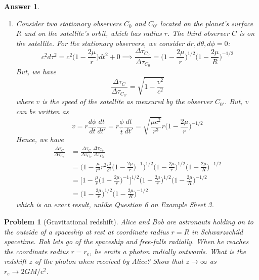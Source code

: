 \documentclass[a4paper]{article}
\theoremstyle{new2}
\newtheorem{ans}{Answer}[section]
\theoremstyle{new}
\newtheorem{qns}{Problem}[section]
\begin{document}
\begin{ans}
\begin{enumerate}[label=(\alph*)]
$$,\quad\Gamma^\theta_{r\theta}=\frac{2}{r}\frac{1}{2}=\frac{1}{r}$$
$$\Gamma^\phi_{\theta\phi}=2\cot\theta\frac{1}{2},\quad\Gamma^\phi_{r\phi}=\frac{2}{r}\frac{1}{2}$$
where we take a factor 1/2 if the connection $\Gamma$ has unequal lower indices since $\dot{x}^\nu\dot{x}^\sigma$ term is summed twice and that the connection is symmetric in its lower indices.
\newpage
\item Consider two stationary observers $C_0$ and $C_{0'}$ located on the planet's surface $R$ and on the satellite's orbit, which has radius $r$. The third observer $C$ is on the satellite. For the stationary observers, we consider $dr,d\theta,d\phi=0$:
$$c^2d\tau^2=c^2\bigg(1-\frac{2\mu}{r}\bigg)dt^2+0\implies\frac{\Delta\tau_{C_{0'}}}{\Delta\tau_{C_0}}=\bigg(1-\frac{2\mu}{r}\bigg)^{1/2}\bigg(1-\frac{2\mu}{R}\bigg)^{-1/2}$$
But, we have
$$\frac{\Delta\tau_C}{\Delta\tau_{C_{0'}}}=\sqrt{1-\frac{v^2}{c^2}}$$
where $v$ is the speed of the satellite as measured by the observer $C_{0'}$. But, $v$ can be written as
$$v=r\frac{d\phi}{dt}\frac{dt}{dt'}=r\frac{\dot{\phi}}{\dot{t}}\frac{dt}{dt'}=\sqrt{\frac{\mu c^2}{r^3}}r\bigg(1-\frac{2\mu}{r}\bigg)^{-1/2}$$
Hence, we have
\begin{align}
    \frac{\Delta\tau_C}{\Delta\tau_{C_0}}&=\frac{\Delta\tau_C}{\Delta\tau_{C_{0'}}}\frac{\Delta\tau_{C_{0'}}}{\Delta\tau_{C_0}}\nonumber\\&=\bigg(1-\frac{\mu}{r^3}r^2\frac{c^2}{c^2}\bigg(1-\frac{2\mu}{r}\bigg)^{-1}\bigg)^{1/2}\bigg(1-\frac{2\mu}{r}\bigg)^{1/2}\bigg(1-\frac{2\mu}{R}\bigg)^{-1/2}\nonumber\\&=    \bigg[1-\frac{\mu}{r}\bigg(1-\frac{2\mu}{r}\bigg)^{-1}\bigg]^{1/2}\bigg(1-\frac{2\mu}{r}\bigg)^{1/2}\bigg(1-\frac{2\mu}{R}\bigg)^{-1/2}\nonumber\\&=\bigg(1-\frac{3\mu}{r}\bigg)^{1/2}\bigg(1-\frac{2\mu}{R}\bigg)^{-1/2}\nonumber
\end{align}
which is an exact result, unlike Question 6 on Example Sheet 3.
\end{enumerate}
\end{ans}
\newpage
\begin{qns}[Gravitational redshift]
Alice and Bob are astronauts holding on to the outside of a spaceship at rest at coordinate radius $r = R$ in Schwarzschild spacetime. Bob lets go of the spaceship and free-falls radially. When he reaches the coordinate radius $r=r_e$, he emits a photon radially outwards. What is the redshift $z$ of the photon when received by Alice? Show that $z\rightarrow\infty$ as $r_e\rightarrow 2GM/c^2$.
\end{qns}
\end{document}
